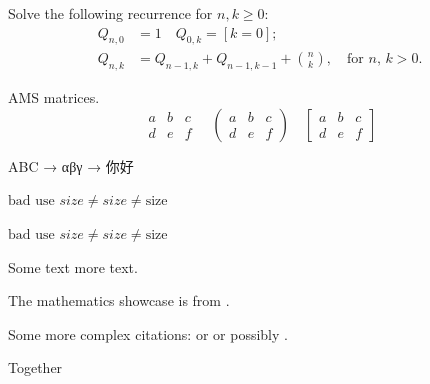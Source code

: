 \documentclass[a4paper,12pt]{book} %
\begin{document}
Solve the following recurrence for $ n,k\geq 0 $:
\begin{align*}
  Q_{n,0} &= 1   \quad Q_{0,k} = [k=0];  \\
  Q_{n,k} &= Q_{n-1,k}+Q_{n-1,k-1}+\binom{n}{k}, \quad\text{for $n$, $k>0$.}
\end{align*}

AMS matrices.
\[
\begin{matrix}
  a & b & c \\
  d & e & f
\end{matrix}
\quad
\begin{pmatrix}
  a & b & c \\
  d & e & f
\end{pmatrix}
\quad
\begin{bmatrix}
  a & b & c \\
  d & e & f
\end{bmatrix}
\]


ABC → αβγ → {\cjkfont 你好}

$\text{bad use } size  \neq \mathit{size} \neq \mathrm{size} $

\textit{$\text{bad use } size \neq \mathit{size} \neq \mathrm{size} $}

Some text \hspace{1cm} more text.

\vspace{10cm}


The mathematics showcase is from \autocite{Graham1995}.

Some more complex citations: \parencite{Graham1995} or
\textcite{Thomas2008} or possibly .

\autocite[56]{Thomas2008}

\autocite[See][45-48]{Graham1995}

Together \autocite{Thomas2008,Graham1995}

\printbibliography
\end{document}
